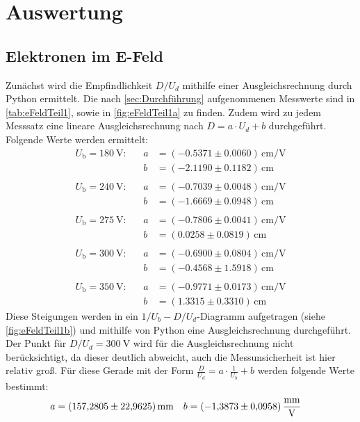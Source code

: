 \section{Auswertung}
\label{sec:Auswertung}
\subsection{Elektronen im E-Feld}
\label{subsec:E-Feld}

Zunächst wird die Empfindlichkeit $D/U_d$ mithilfe einer Ausgleichsrechnung durch Python ermittelt.
Die nach \autoref{sec:Durchführung} aufgenommenen Messwerte sind in \autoref{tab:eFeldTeil1}, sowie in \autoref{fig:eFeldTeil1a} zu finden.
Zudem wird zu jedem Messsatz eine lineare Ausgleichsrechnung nach $D = a \cdot U_d + b$ durchgeführt.
Folgende Werte werden ermittelt:
\begin{align*}
    U_\text{b} = \SI{180}{\volt} :&  &a&= (-0.5371 \pm 0.0060) \,\si{\centi\metre\per\volt}\\
    &  &b&= (-2.1190 \pm 0.1182) \, \si{\centi\metre}\\
    \\
    U_\text{b} = \SI{240}{\volt}:& &a&= (-0.7039 \pm 0.0048) \, \si{\centi\metre\per\volt}\\
    & &b&= (-1.6669 \pm 0.0948) \, \si{\centi\metre}\\
    \\
    U_\text{b} = \SI{275}{\volt}:& &a&= (-0.7806 \pm 0.0041) \, \si{\centi\metre\per\volt}\\
    & &b&= (0.0258 \pm 0.0819) \, \si{\centi\metre} \\
    \\
    U_\text{b} = \SI{300}{\volt}: & &a& = (-0.6900 \pm 0.0804) \, \si{\centi\metre\per\volt}\\
    & &b& = (-0.4568 \pm 1.5918) \, \si{\centi\metre}\\
    \\
    U_\text{b} = \SI{350}{\volt}: & &a& = (-0.9771 \pm 0.0173) \, \si{\centi\metre\per\volt} \\
    & &b&= (1.3315 \pm 0.3310 ) \, \si{\centi\metre}
\end{align*}
\noindent
Diese Steigungen werden in ein $1/U_b - D/U_d$-Diagramm aufgetragen (siehe \autoref{fig:eFeldTeil1b}) und mithilfe von Python eine Ausgleichsrechnung durchgeführt. \\
Der Punkt für $D/U_d = \SI{300}{\volt}$ wird für die Ausgleichsrechnung nicht berücksichtigt, da dieser deutlich abweicht, auch die Messunsicherheit ist hier relativ groß.
Für diese Gerade mit der Form $\frac{D}{U_d} = a \cdot \frac{1}{U_b} + b$ werden folgende Werte bestimmt:
\begin{align*}
    a &=  \SI{157.2805 \pm 22.9625}{\milli\metre} &b &= \SI{-1.3873 \pm 0.0958}{\milli\metre\per\volt}
\end{align*}

